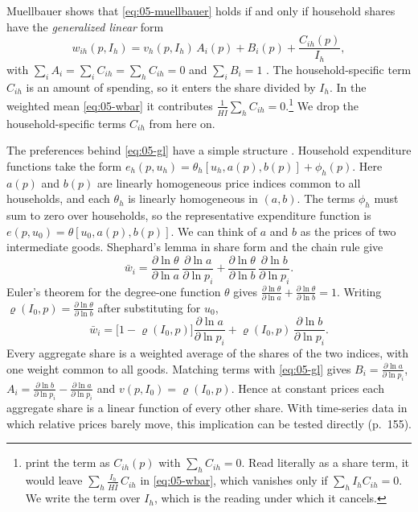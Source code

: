 Muellbauer shows that \eqref{eq:05-muellbauer} holds if and only if household shares have the
\emph{generalized linear} form
\begin{equation}\label{eq:05-gl}
  w_{ih}(p, I_h) = v_h(p, I_h)\, A_i(p) + B_i(p) + \frac{C_{ih}(p)}{I_h},
\end{equation}
with $\sum_i A_i = \sum_i C_{ih} = \sum_h C_{ih} = 0$ and $\sum_i B_i = 1$
\citep[eq.~A2]{DeatonMuellbauer1980a}. The household-specific term $C_{ih}$ is an amount of spending, so it
enters the share divided by $I_h$. In the weighted mean \eqref{eq:05-wbar} it contributes $\frac{1}{H\bar
I}\sum_h C_{ih} = 0$.\footnote{\citet[eq.~A2]{DeatonMuellbauer1980a} print the term as $C_{ih}(p)$ with
$\sum_h C_{ih} = 0$. Read literally as a share term, it would leave $\sum_h \frac{I_h}{H\bar I}\,
C_{ih}$ in \eqref{eq:05-wbar}, which vanishes only if $\sum_h I_h C_{ih} = 0$. We write the term over
$I_h$, which is the reading under which it cancels.} We drop the household-specific terms $C_{ih}$ from
here on.

The preferences behind \eqref{eq:05-gl} have a simple structure \citep[\S 6.2, eqs.~2.3--2.6,
pp.~154--155]{DeatonMuellbauer1980b}. Household expenditure functions take the form $e_h(p, u_h) =
\theta_h[u_h, a(p), b(p)] + \phi_h(p)$. Here $a(p)$ and $b(p)$ are linearly homogeneous price indices
common to all households, and each $\theta_h$ is linearly homogeneous in $(a, b)$. The terms $\phi_h$ must
sum to zero over households, so the representative expenditure function is $e(p, u_0) = \theta[u_0,
a(p), b(p)]$. We can think of $a$ and $b$ as the prices of two intermediate goods. Shephard's lemma in
share form and the chain rule give
\begin{equation*}
  \bar w_i = \frac{\partial\ln\theta}{\partial\ln a}\,\frac{\partial\ln a}{\partial\ln p_i}
           + \frac{\partial\ln\theta}{\partial\ln b}\,\frac{\partial\ln b}{\partial\ln p_i} .
\end{equation*}
Euler's theorem for the degree-one function $\theta$ gives $\frac{\partial\ln\theta}{\partial\ln a} +
\frac{\partial\ln\theta}{\partial\ln b} = 1$. Writing $\varrho(I_0, p) = \frac{\partial\ln\theta}{\partial
\ln b}$ after substituting for $u_0$,
\begin{equation}\label{eq:05-gl-shares}
  \bar w_i = \bigl[1 - \varrho(I_0, p)\bigr]\frac{\partial\ln a}{\partial\ln p_i}
           + \varrho(I_0, p)\,\frac{\partial\ln b}{\partial\ln p_i} .
\end{equation}
Every aggregate share is a weighted average of the shares of the two indices, with one weight common to
all goods. Matching terms with \eqref{eq:05-gl} gives $B_i = \frac{\partial\ln a}{\partial\ln p_i}$, $A_i
= \frac{\partial\ln b}{\partial\ln p_i} - \frac{\partial\ln a}{\partial\ln p_i}$ and $v(p, I_0) =
\varrho(I_0, p)$. Hence
at constant prices each aggregate share is a linear function of every other share. With time-series data
in which relative prices barely move, this implication can be tested directly (p.~155).

